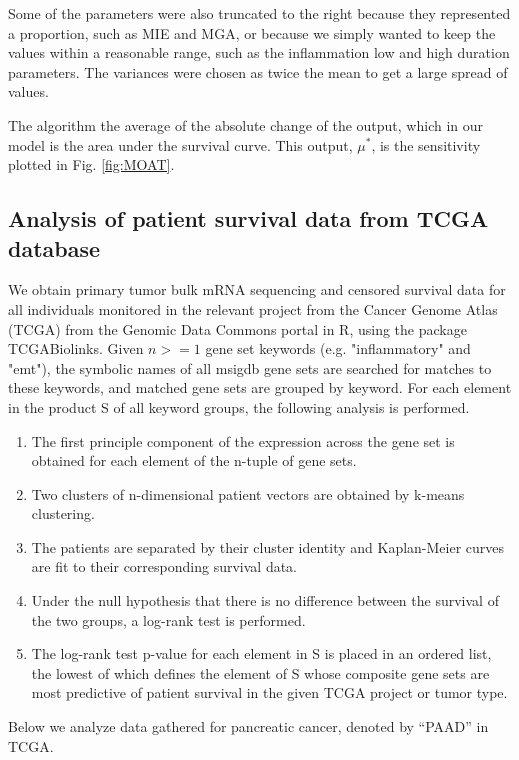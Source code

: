\documentclass[11pt]{article}
\newcommand{\tcr} { \textcolor{red} }
\begin{document}
Some of the parameters were also truncated to the right because they represented a proportion, such as MIE and MGA, or because we simply wanted to keep the values within a reasonable range, such as the inflammation low and high duration parameters.
The variances were chosen as twice the mean to get a large spread of values.
\par
The algorithm the average of the absolute change of the output, which in our model is the area under the survival curve.
This output, $\mu^*$, is the sensitivity plotted in Fig. \ref{fig:MOAT}.


\subsection{Analysis of patient survival data from TCGA database}
We obtain primary tumor bulk mRNA sequencing and censored survival data for all individuals monitored in the relevant project from the Cancer Genome Atlas (TCGA) from the Genomic Data Commons portal in R, using the package TCGABiolinks.  Given $n >= 1$ gene set keywords (e.g. "inflammatory" and "emt"), the symbolic names of all msigdb gene sets are searched for matches to these keywords, and matched gene sets are grouped by keyword. For each element in the product S of all keyword groups, the following analysis is performed.
\begin{enumerate}
     \item The first principle component of the expression across the gene set is obtained for each element of the n-tuple of gene sets.
     \item Two clusters of n-dimensional patient vectors are obtained by k-means clustering.
     \item The patients are separated by their cluster identity and Kaplan-Meier curves are fit to their corresponding survival data.
     \item Under the null hypothesis that there is no difference between the survival of the two groups, a log-rank test is performed.
     \item The log-rank test p-value for each element in S is placed in an ordered list, the lowest of which defines the element of S whose composite gene sets are most predictive of patient survival in the given TCGA project or tumor type.
\end{enumerate}
Below we analyze data gathered for pancreatic cancer, denoted by ``PAAD'' in TCGA.     
\end{document}
